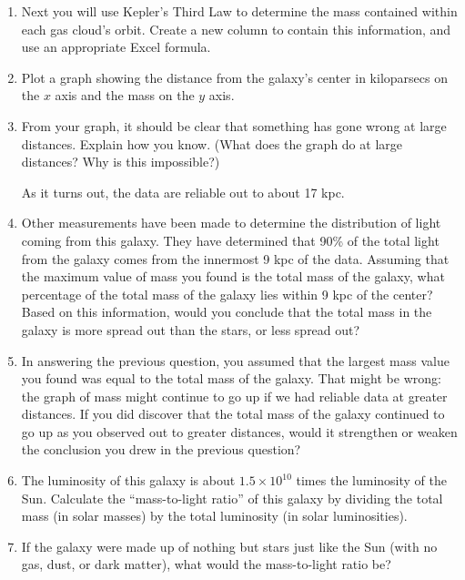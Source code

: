\begin{enumerate}
\item Next you will use Kepler's Third Law to determine the mass contained
within each gas cloud's orbit.  Create a new column to contain
this information, and use an appropriate Excel formula.

\item Plot a graph showing the distance from the galaxy's center
in kiloparsecs on the $x$ axis and the mass on the $y$ axis.

\item From your graph, it should be clear that something has gone 
wrong at large distances.  Explain how you know.  (What does the graph
do at large distances?  Why is this impossible?)

\answerspace{1.5in}

As it turns out, the data are reliable out to about 17 kpc.

\item Other measurements have been made to determine the 
distribution of light coming from this galaxy.  They have determined
that 90\% of the total light from the galaxy comes from the
innermost 9 kpc of the data.  Assuming that the maximum value
of mass you found is the total mass of the galaxy, what percentage of the
total mass of the galaxy lies within 9 kpc of the center? 
Based on this information, would you conclude that the total mass
in the galaxy is more spread out than the stars, or less spread out?


\answerspace{1.5in}

\item In answering the previous question, you assumed that the
largest mass value you found was equal to the total mass of the galaxy.
That might be wrong: the graph of mass might continue to go up if
we had reliable data at greater distances.  If you did discover
that the total mass of the galaxy continued to go up as you observed
out to greater distances, would it strengthen or weaken
the conclusion you drew in the previous question?


\item The luminosity of this galaxy is about $1.5\times 10^{10}$
times the luminosity of the Sun.  Calculate the ``mass-to-light
ratio'' of this galaxy by dividing the total mass (in solar masses)
by the total luminosity (in solar luminosities).  

\vskip 0.5in

\item If the galaxy were made
up of nothing but stars just like the Sun (with no gas, dust,
or dark matter), what would the mass-to-light ratio be?


\end{enumerate}
